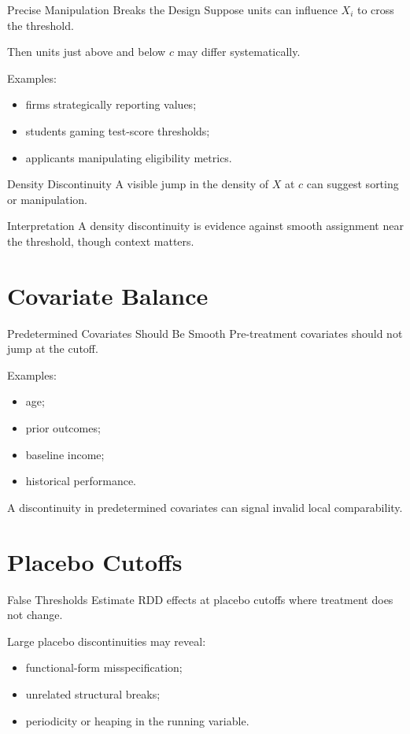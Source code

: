 \documentclass[aspectratio=169,11pt]{beamer}
\begin{document}
\begin{frame}{Precise Manipulation Breaks the Design}
Suppose units can influence \(X_i\) to cross the threshold.

Then units just above and below \(c\) may differ systematically.

Examples:
\begin{itemize}
\item firms strategically reporting values;
\item students gaming test-score thresholds;
\item applicants manipulating eligibility metrics.
\end{itemize}
\end{frame}

\begin{frame}{Density Discontinuity}
A visible jump in the density of \(X\) at \(c\) can suggest sorting or manipulation.

\begin{alertblock}{Interpretation}
A density discontinuity is evidence against smooth assignment near the threshold, though context matters.
\end{alertblock}
\end{frame}

\section{Covariate Balance}

\begin{frame}{Predetermined Covariates Should Be Smooth}
Pre-treatment covariates should not jump at the cutoff.

Examples:
\begin{itemize}
\item age;
\item prior outcomes;
\item baseline income;
\item historical performance.
\end{itemize}

A discontinuity in predetermined covariates can signal invalid local comparability.
\end{frame}

\section{Placebo Cutoffs}

\begin{frame}{False Thresholds}
Estimate RDD effects at placebo cutoffs where treatment does not change.

Large placebo discontinuities may reveal:
\begin{itemize}
\item functional-form misspecification;
\item unrelated structural breaks;
\item periodicity or heaping in the running variable.
\end{itemize}
\end{frame}
\end{document}
